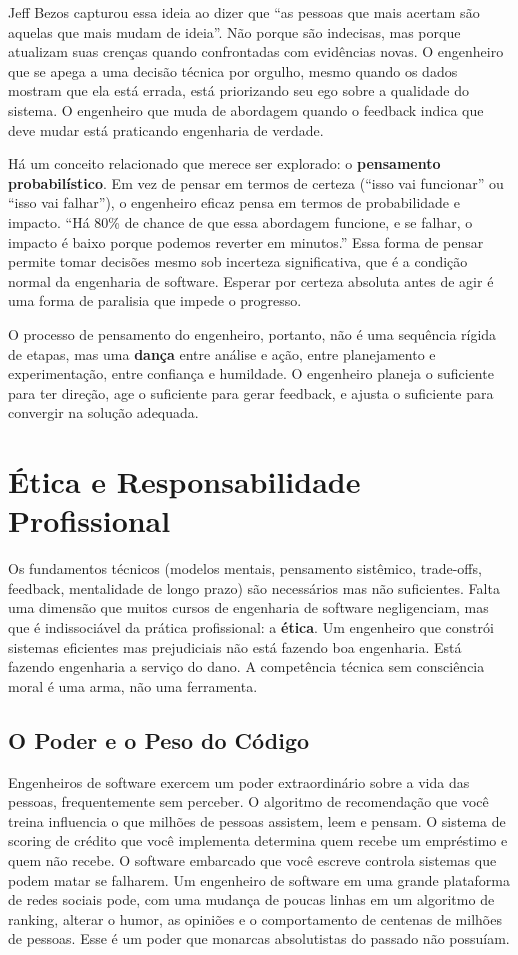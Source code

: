 Jeff Bezos capturou essa ideia ao dizer que ``as pessoas que mais acertam
são aquelas que mais mudam de ideia''. Não porque são indecisas, mas
porque atualizam suas crenças quando confrontadas com evidências novas.
O engenheiro que se apega a uma decisão técnica por orgulho, mesmo quando
os dados mostram que ela está errada, está priorizando seu ego sobre a
qualidade do sistema. O engenheiro que muda de abordagem quando o feedback
indica que deve mudar está praticando engenharia de verdade.

Há um conceito relacionado que merece ser explorado: o \textbf{pensamento
probabilístico}. Em vez de pensar em termos de certeza (``isso vai
funcionar'' ou ``isso vai falhar''), o engenheiro eficaz pensa em
termos de probabilidade e impacto. ``Há 80\% de chance de que essa
abordagem funcione, e se falhar, o impacto é baixo porque podemos
reverter em minutos.'' Essa forma de pensar permite tomar decisões mesmo
sob incerteza significativa, que é a condição normal da engenharia de
software. Esperar por certeza absoluta antes de agir é uma forma de
paralisia que impede o progresso.

O processo de pensamento do engenheiro, portanto, não é uma sequência
rígida de etapas, mas uma \textbf{dança} entre análise e ação, entre
planejamento e experimentação, entre confiança e humildade. O engenheiro
planeja o suficiente para ter direção, age o suficiente para gerar
feedback, e ajusta o suficiente para convergir na solução adequada.

\section{Ética e Responsabilidade Profissional}

Os fundamentos técnicos (modelos mentais, pensamento sistêmico,
trade-offs, feedback, mentalidade de longo prazo) são necessários
mas não suficientes. Falta uma dimensão que muitos cursos de engenharia
de software negligenciam, mas que é indissociável da prática profissional:
a \textbf{ética}. Um engenheiro que constrói sistemas eficientes mas
prejudiciais não está fazendo boa engenharia. Está fazendo engenharia
a serviço do dano. A competência técnica sem consciência moral é uma
arma, não uma ferramenta.

\subsection{O Poder e o Peso do Código}

Engenheiros de software exercem um poder extraordinário sobre a vida das
pessoas, frequentemente sem perceber. O algoritmo de recomendação que
você treina influencia o que milhões de pessoas assistem, leem e pensam.
O sistema de scoring de crédito que você implementa determina quem recebe
um empréstimo e quem não recebe. O software embarcado que você escreve
controla sistemas que podem matar se falharem. Um engenheiro de software
em uma grande plataforma de redes sociais pode, com uma mudança de poucas
linhas em um algoritmo de ranking, alterar o humor, as opiniões e o
comportamento de centenas de milhões de pessoas. Esse é um poder que
monarcas absolutistas do passado não possuíam.

